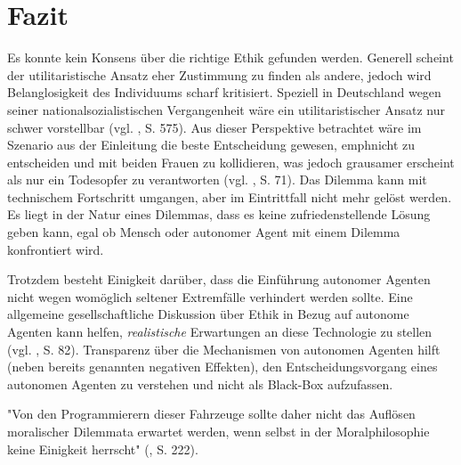 \documentclass[a4paper, 12pt, titlepage]{scrartcl}
\begin{document}
\section{Fazit}
	Es konnte kein Konsens \"uber die \glqq richtige\grqq{} Ethik gefunden werden. Generell scheint der utilitaristische Ansatz eher Zustimmung zu finden als andere, jedoch wird Belanglosigkeit des Individuums scharf kritisiert. Speziell in Deutschland wegen seiner nationalsozialistischen Vergangenheit w\"are ein utilitaristischer Ansatz nur schwer vorstellbar (vgl. \autocite{Gless2016}, S. 575). Aus dieser Perspektive betrachtet w\"are im Szenario aus der Einleitung die beste Entscheidung gewesen, emph{nicht} zu entscheiden und mit beiden Frauen zu kollidieren, was jedoch grausamer erscheint als nur ein Todesopfer zu verantworten (vgl. \autocite{Lin2015}, S. 71). Das Dilemma kann mit technischem Fortschritt umgangen, aber im Eintrittfall nicht mehr gel\"ost werden. Es liegt in der Natur eines Dilemmas, dass es keine zufriedenstellende L\"osung geben kann, egal ob Mensch oder autonomer Agent mit einem Dilemma konfrontiert wird. 
	
	Trotzdem besteht Einigkeit dar\"uber, dass die Einf\"uhrung autonomer Agenten nicht wegen womöglich seltener Extremf\"alle verhindert werden sollte. Eine allgemeine gesellschaftliche Diskussion \"uber Ethik in Bezug auf autonome Agenten kann helfen, \emph{realistische} Erwartungen an diese Technologie zu stellen (vgl. \autocite{Lin2015}, S. 82). Transparenz \"uber die Mechanismen von autonomen Agenten hilft (neben bereits genannten negativen Effekten), den Entscheidungsvorgang eines autonomen Agenten zu verstehen und nicht als \glqq Black-Box\grqq{} aufzufassen. 
	
	"Von den Programmierern dieser Fahrzeuge sollte daher nicht das Auflösen moralischer Dilemmata erwartet werden, wenn selbst in der Moralphilosophie keine Einigkeit herrscht" (\autocite{Scholz2016}, S. 222).
 

\newpage
\printbibliography
\end{document}
